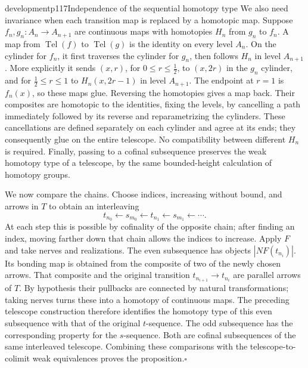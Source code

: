 \begin{dcomment}{development}{p117}{Independence of the sequential homotopy type}
We also need invariance when each transition map is replaced by a homotopic map.  Suppose $f_n,g_n:A_n\to A_{n+1}$ are continuous maps with homotopies $H_n$ from $g_n$ to $f_n$.  A map from $\operatorname{Tel}(f)$ to $\operatorname{Tel}(g)$ is the identity on every level $A_n$.  On the cylinder for $f_n$, it first traverses the cylinder for $g_n$, then follows $H_n$ in level $A_{n+1}$.  More explicitly it sends $(x,r)$, for $0\leq r\leq\tfrac12$, to $(x,2r)$ in the $g_n$ cylinder, and for $\tfrac12\leq r\leq1$ to $H_n(x,2r-1)$ in level $A_{n+1}$.  The endpoint at $r=1$ is $f_n(x)$, so these maps glue.  Reversing the homotopies gives a map back.  Their composites are homotopic to the identities, fixing the levels, by cancelling a path immediately followed by its reverse and reparametrizing the cylinders.  These cancellations are defined separately on each cylinder and agree at its ends; they consequently glue on the entire telescope.  No compatibility between different $H_n$ is required.  Finally, passing to a cofinal subsequence preserves the weak homotopy type of a telescope, by the same bounded-height calculation of homotopy groups.

We now compare the chains.  Choose indices, increasing without bound, and arrows in $T$ to obtain an interleaving
\[
 t_{n_0}\longleftarrow s_{m_0}\longleftarrow
 t_{n_1}\longleftarrow s_{m_1}\longleftarrow\cdots.
\]
At each step this is possible by cofinality of the opposite chain; after finding an index, moving farther down that chain allows the indices to increase.  Apply $F$ and take nerves and realizations.  The even subsequence has objects $|NF(t_{n_i})|$.  Its bonding map is obtained from the composite of two of the newly chosen arrows.  That composite and the original transition $t_{n_{i+1}}\to t_{n_i}$ are parallel arrows of $T$.  By hypothesis their pullbacks are connected by natural transformations; taking nerves turns these into a homotopy of continuous maps.  The preceding telescope construction therefore identifies the homotopy type of this even subsequence with that of the original $t$-sequence.  The odd subsequence has the corresponding property for the $s$-sequence.  Both are cofinal subsequences of the same interleaved telescope.  Combining these comparisons with the telescope-to-colimit weak equivalences proves the proposition.\hfill$\square$

\end{dcomment}

